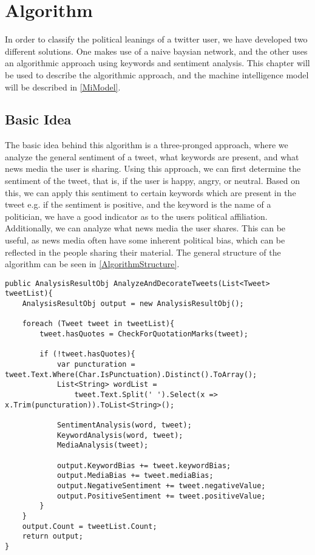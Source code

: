 \chapter{Algorithm}
In order to classify the political leanings of a twitter user, we have developed
two different solutions. One makes use of a naive baysian network, and the
other uses an algorithmic approach using keywords and sentiment analysis. This
chapter will be used to describe the algorithmic approach, and the machine
intelligence model will be described in \autoref{MiModel}.

\section{Basic Idea}
The basic idea behind this algorithm is a three-pronged approach, where we
analyze the general sentiment of a tweet, what keywords are present, and what
news media the user is sharing. Using this approach, we can first determine the
sentiment of the tweet, that is, if the user is happy, angry, or neutral. Based
on this, we can apply this sentiment to certain keywords which are present in
the tweet e.g. if the sentiment is positive, and the keyword is the name of a
politician, we have a good indicator as to the users political affiliation.
Additionally, we can analyze what news media the user shares. This can be
useful, as news media often have some inherent political bias, which can be
reflected in the people sharing their material. The general structure of the
algorithm can be seen in \autoref{AlgorithmStructure}.\\

\begin{minipage}[H]{\linewidth}
\begin{lstlisting}[caption = Main method for handling the algorithm, label = AlgorithmStructure]
public AnalysisResultObj AnalyzeAndDecorateTweets(List<Tweet> tweetList){
	AnalysisResultObj output = new AnalysisResultObj();
   	
   	foreach (Tweet tweet in tweetList){
       	tweet.hasQuotes = CheckForQuotationMarks(tweet);
        
        if (!tweet.hasQuotes){
           	var puncturation = tweet.Text.Where(Char.IsPunctuation).Distinct().ToArray(); 
           	List<String> wordList = 
           		tweet.Text.Split(' ').Select(x => x.Trim(puncturation)).ToList<String>();
                       
            SentimentAnalysis(word, tweet);
            KeywordAnalysis(word, tweet);
            MediaAnalysis(tweet);

            output.KeywordBias += tweet.keywordBias;
            output.MediaBias += tweet.mediaBias;
            output.NegativeSentiment += tweet.negativeValue;
            output.PositiveSentiment += tweet.positiveValue;
        }
    }
    output.Count = tweetList.Count;
    return output;
}
\end{lstlisting}
\end{minipage}

